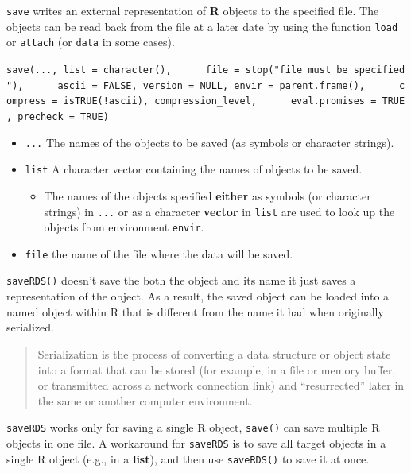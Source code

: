 \documentclass[
  a4paper,
  twoside,
  openright]{book}
\providecommand{\tightlist}{%
  \setlength{\itemsep}{0pt}\setlength{\parskip}{0pt}}
\theoremstyle{definition}
\theoremstyle{definition}
\theoremstyle{definition}
\theoremstyle{definition}
\theoremstyle{remark}
\begin{document}
\texttt{save} writes an external representation of \textbf{R} objects to the specified file. The objects can be read back from the file at a later date by using the function \texttt{load} or \texttt{attach} (or \texttt{data} in some cases).

\texttt{save(...,\ list\ =\ character(),\ \ \ \ \ \ file\ =\ stop("\textquotesingle{}file\textquotesingle{}\ must\ be\ specified"),\ \ \ \ \ \ ascii\ =\ FALSE,\ version\ =\ NULL,\ envir\ =\ parent.frame(),\ \ \ \ \ \ compress\ =\ isTRUE(!ascii),\ compression\_level,\ \ \ \ \ \ eval.promises\ =\ TRUE,\ precheck\ =\ TRUE)}

\begin{itemize}
\tightlist
\item
  \texttt{...} The names of the objects to be saved (as symbols or character strings).
\item
  \texttt{list} A character vector containing the names of objects to be saved.

  \begin{itemize}
  \tightlist
  \item
    The names of the objects specified \textbf{either} as symbols (or character strings) in \texttt{...} or as a character \textbf{vector} in \texttt{list} are used to look up the objects from environment \texttt{envir}.
  \end{itemize}
\item
  \texttt{file} the name of the file where the data will be saved.
\end{itemize}

\texttt{saveRDS()} doesn't save the both the object and its name it just saves a representation of the object. As a result, {the saved object can be loaded into a named object} within R that is different from the name it had when originally serialized.

\begin{quote}
Serialization is the process of converting a data structure or object state into a format that can be stored (for example, in a file or memory buffer, or transmitted across a network connection link) and ``resurrected'' later in the same or another computer environment.
\end{quote}

\texttt{saveRDS} works only for {saving a single R object}, \texttt{save()} can save multiple R objects in one file. A workaround for \texttt{saveRDS} is to save all target objects in a single R object (e.g., in a \textbf{list}), and then use \texttt{saveRDS()} to save it at once.
\end{document}
